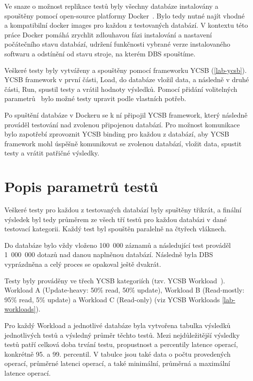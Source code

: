 \documentclass[czech,master,dept460,male,csharp,cpdeclaration]{diploma}
\begin{document}
	Ve snaze o možnost replikace testů byly všechny databáze instalovány a spouštěny pomocí open-source platformy Docker~\cite{docker}. Bylo tedy nutné najít vhodné a kompatibilní docker images pro každou z testovaných databází. V kontextu této práce Docker pomáhá zrychlit zdlouhavou fázi instalování a nastavení počátečního stavu databází, udržení funkčnosti vybrané verze instalovaného softwaru a odstínění od stavu stroje, na kterém DBS spouštíme.
	
	Veškeré testy byly vytvářeny a spouštěny pomocí frameworku YCSB (\ref{lab-ycsb}). YCSB framework v první části, Load, do databáze vložil data, a následně v druhé části, Run, spustil testy a vrátil hodnoty výsledků. Pomocí přidání volitelných parametrů~\cite{ycsb-properties} bylo možné testy upravit podle vlastních potřeb.
	
	Po spuštění databáze v Dockeru se k ní připojil YCSB framework, který následně prováděl testování nad zvolenou připojenou databází. Pro možnost komunikace bylo zapotřebí zprovoznit YCSB binding pro každou z databází, aby YCSB framework mohl úspěšně komunikovat se zvolenou databází, vložit data, spustit testy a vrátit patřičné výsledky.
	
	\section{Popis parametrů testů}
	
	Veškeré testy pro každou z testovaných databází byly spuštěny třikrát, a finální výsledek byl tedy průměrem ze všech tří testů pro každou databázi v dané testovací kategorii. Každý test byl spouštěn paralelně na čtyřech vláknech.
	
	Do databáze bylo vždy vloženo 100~000 záznamů a následující test prováděl 1~000~000 dotazů nad danou naplněnou databází. Následně byla DBS vyprázdněna a celý proces se opakoval ještě dvakrát.
	
	Testy byly prováděny ve třech YCSB kategoriích (tzv. YCSB Workload~\cite{workloads}). Workload A (Update-heavy: 50\% read, 50\% update), Workload B (Read-mostly: 95\% read, 5\% update) a Workload C (Read-only) (viz YCSB Workloads \ref{lab-workloads}).
	
	Pro každý Workload a jednotlivé databáze byla vytvořena tabulka výsledků jednotlivých testů a výsledný průměr těchto testů. Mezi nejdůležitější výsledky testů patří celková doba trvání testu, propustnost a percentily latence operací, konkrétně 95. a 99. percentil. V tabulce jsou také data o počtu provedených operací, průměrné latenci operací, a také minimální, průměrná a maximální latence operací.
	
\end{document}
